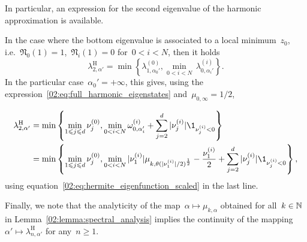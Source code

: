     In particular, an expression for the second eigenvalue of the harmonic approximation is available.
    \begin{remark}
    In the case where the bottom eigenvalue is associated to a local minimum~$z_0$, i.e.~$\mathfrak{N}_0(1)=1$,~$\mathfrak{N}_i(1)=0$ for~$0< i < N$, then it holds
    \begin{equation}
    \lambda_{2,\alpha'}^{\mathrm{H}} = \min\left\{\lambda_{1,\alpha_0'}^{(0)},\underset{0<i<N}{\min}\,\lambda_{0,\alpha_i'}^{(i)}\right\}.
    \end{equation}
    In the particular case~$\alpha_0'=+\infty$, this gives, using the expression~\eqref{02:eq:full_harmonic_eigenstates} and~$\mu_{0,\infty}=1/2$,
   
    \begin{equation}
    \label{02:eq:lambda_2_expr}
    \begin{aligned}
     \lambda_{2,\alpha'}^{\mathrm{H}} &= \min\left\{\underset{1\leq j\leq d}{\min}\,\hessEigval{0}{j},\underset{0<i<N}{\min}\,\omega_{0,\alpha_i'}^{(i)}+\sum_{j=2}^d |\hessEigval{i}{j}|\1_{\hessEigval{i}{j}<0}\right\}\\
     &= \min\left\{\underset{1\leq j\leq d}{\min}\,\hessEigval{0}{j},\underset{0<i<N}{\min}\,|\nu^{(i)}_1|\mu_{k,\theta(|\hessEigval{i}{1}|/2)^{\frac12}} - \frac{\nu^{(i)}_1}2+\sum_{j=2}^d |\hessEigval{i}{j}|\1_{\hessEigval{i}{j}<0}\right\},
    \end{aligned}
    \end{equation}
    using equation~\eqref{02:eq:hermite_eigenfunction_scaled} in the last line.
    \end{remark}
    
    Finally, we note that the analyticity of the map~$\alpha \mapsto \mu_{k,\alpha}$ obtained for all~$k\in \mathbb{N}$ in Lemma~\ref{02:lemma:spectral_analysis} implies the continuity of the mapping~$\alpha' \mapsto \lambda_{n,\alpha'}^{\mathrm H}$ for any~$n\geq 1$.

